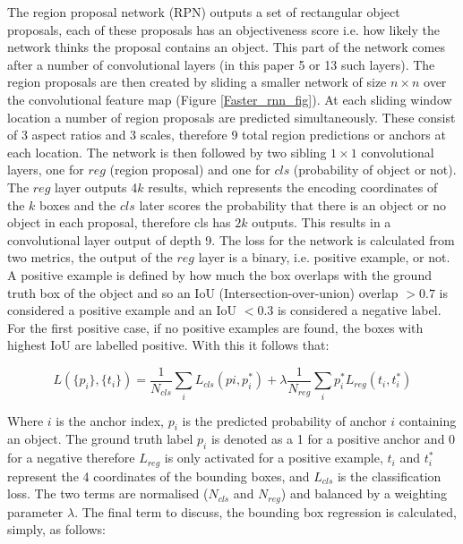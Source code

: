 \documentclass[11pt,twoside]{report}
\begin{document}
The region proposal network (RPN) outputs a set of rectangular object proposals, each of these proposals has an objectiveness score i.e. how likely the network thinks the proposal contains an object. This part of the network comes after a number of convolutional layers (in this paper 5 or 13 such layers). The region proposals are then created by sliding a smaller network of size $n \times n$ over the convolutional feature map (Figure \ref{Faster_rnn_fig}). At each sliding window location a number of region proposals are predicted simultaneously. These consist of 3 aspect ratios and 3 scales, therefore 9 total region predictions or anchors at each location. The network is then followed by two sibling $1 \times 1$ convolutional layers, one for $reg$ (region proposal) and one for $cls$ (probability of object or not). The $reg$ layer outputs 4$k$ results, which represents the encoding coordinates of the $k$ boxes and the $cls$ later scores the probability that there is an object or no object in each proposal, therefore cls has $2k$ outputs. This results in a convolutional layer output of depth 9.
\newline \newline
The loss for the network is calculated from two metrics, the output of the $reg$ layer is a binary, i.e. positive example, or not. A positive example is defined by how much the box overlaps with the ground truth box of the object and so an IoU (Intersection-over-union) overlap $> 0.7$ is considered a positive example and an IoU $< 0.3$ is considered a negative label. For the first positive case, if no positive examples are found, the boxes with highest IoU  are labelled positive. With this it follows that:

\begin{equation}
\label{multi-task_loss_fast_rcnn}
L(\{p_{i}\},\{t_{i}\}) = \frac{1}{N_{cls}} \sum_{i} L_{cls}(p{i},p_{i}^{*}) + \lambda \frac{1}{N_{reg}} \sum_{i}p_{i}^{*} L_{reg}(t_{i},t_{i}^{*})
\end{equation}

Where $i$ is the anchor index, $p_{i}$ is the predicted probability of anchor $i$ containing an object. The ground truth label $p_{i}$ is denoted as a 1 for a positive anchor and 0 for a negative therefore $L_{reg}$ is only activated for a positive example, $t_{i}$ and $t_{i}^{*}$ represent the 4 coordinates of the bounding boxes, and $L_{cls}$ is the classification loss. The two terms are normalised ($N_{cls}$ and $N_{reg}$) and balanced by a weighting parameter $\lambda$. The final term to discuss, the bounding box regression is calculated, simply, as follows:
\end{document}
